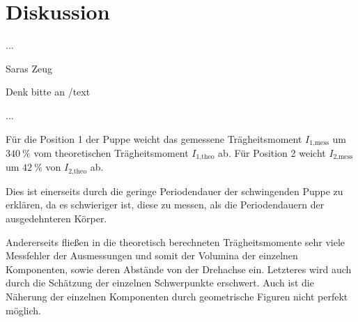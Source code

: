 \section{Diskussion}
\label{sec:Diskussion}

...

Saras Zeug

Denk bitte an /text

...

Für die Position 1 der Puppe weicht das gemessene Trägheitsmoment $I_\text{1,mess}$ um 
$\SI{340}{\percent}$ vom theoretischen Trägheitsmoment $I_\text{1,theo}$ ab. Für Position 2
weicht $I_\text{2,mess}$ um $\SI{42}{\percent}$ von $I_\text{2,theo}$ ab.

Dies ist einerseits durch die geringe Periodendauer der schwingenden Puppe zu erklären,
da es schwieriger ist, diese zu messen, als die Periodendauern der ausgedehnteren Körper.

Andererseits fließen in die theoretisch berechneten Trägheitsmomente sehr viele Messfehler
der Ausmessungen und somit der Volumina der einzelnen Komponenten, sowie deren Abstände 
von der Drehachse ein.
Letzteres wird auch durch die Schätzung der einzelnen Schwerpunkte erschwert. 
Auch ist die Näherung der einzelnen Komponenten durch geometrische Figuren nicht
perfekt möglich.
